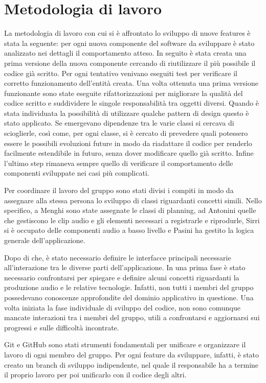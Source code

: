 \documentclass[a4paper,12pt]{report}
\begin{document}
\section{Metodologia di lavoro}
La metodologia di lavoro con cui si è affrontato lo sviluppo di nuove features è stata la seguente: per ogni nuova componente del software da sviluppare è stato analizzato nei dettagli il comportamento atteso.
In seguito è stata creata una prima versione della nuova componente cercando di riutilizzare il più possibile il codice già scritto.
Per ogni tentativo venivano eseguiti test per verificare il corretto funzionamento dell’entità creata. 
Una volta ottenuta una prima versione funzionante sono state eseguite rifattorizzazioni per migliorare la qualità del codice scritto e suddividere le singole responsabilità tra oggetti diversi. Quando è stata individuata la possibilità di utilizzare qualche pattern di design questo è stato applicato.
Se emergevano dipendenze tra le varie classi si cercava di scioglierle, così come, per ogni classe, si è cercato di prevedere quali potessero essere le possibili evoluzioni future in modo da riadattare il codice per renderlo facilmente estendibile in futuro, senza dover modificare quello già scritto.
Infine l’ultimo step rimaneva sempre quello di verificare il comportamento delle componenti sviluppate nei casi più complicati.

Per coordinare il lavoro del gruppo sono stati divisi i compiti in modo da assegnare alla stessa persona lo sviluppo di classi riguardanti concetti simili. Nello specifico, a Menghi sono state assegnate le classi di planning, ad Antonini quelle che gestiscono le clip audio e gli elementi necessari a registrarle e riprodurle, Sirri si è occupato delle componenti audio a basso livello e Pasini ha gestito la logica generale dell'applicazione.

Dopo di che, è stato necessario definire le interfacce principali necessarie all’interazione tra le diverse parti dell’applicazione.
In una prima fase è stato necessario confrontarsi per spiegare e definire alcuni concetti riguardanti la produzione audio e le relative tecnologie. Infatti, non tutti i membri del gruppo possedevano conoscenze approfondite del dominio applicativo in questione. 
Una volta iniziata la fase individuale di sviluppo del codice, non sono comunque mancate interazioni tra i membri del gruppo, utili a confrontarsi e aggiornarsi sui progressi e sulle difficoltà incontrate.

Git e GitHub sono stati strumenti fondamentali per unificare e organizzare il lavoro di ogni membro del gruppo. Per ogni feature da sviluppare, infatti, è stato creato un branch di sviluppo indipendente, nel quale il responsabile ha a termine il proprio lavoro per poi unificarlo con il codice degli altri. 
\end{document}
